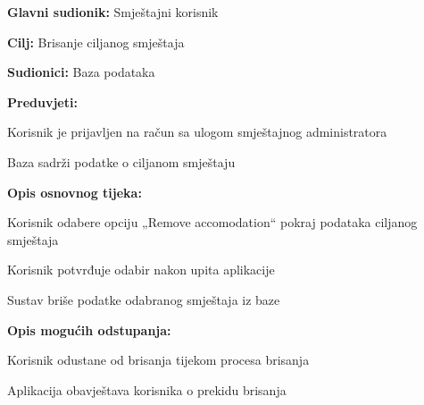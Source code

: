 					\noindent {}
					\begin{packed_item}
						\item \textbf{Glavni sudionik:} Smještajni korisnik
						\item  \textbf{Cilj:} Brisanje ciljanog smještaja
						\item  \textbf{Sudionici:} Baza podataka
						\item  \textbf{Preduvjeti:}
						\item[] \begin{packed_enum}
							\item Korisnik je prijavljen na račun sa ulogom smještajnog administratora
							\item Baza sadrži podatke o ciljanom smještaju
						\end{packed_enum}
						
						\item  \textbf{Opis osnovnog tijeka:}
						\item[] \begin{packed_enum}
							\item Korisnik odabere opciju „Remove accomodation“ pokraj podataka ciljanog smještaja
							\item Korisnik potvrđuje odabir nakon upita aplikacije
							\item Sustav briše podatke odabranog smještaja iz baze
						\end{packed_enum}
						
						\item  \textbf{Opis mogućih odstupanja:}
						\item[] \begin{packed_item}
							\item[2.a] Korisnik odustane od brisanja tijekom procesa brisanja
							\item[] \begin{packed_enum}
								\item Aplikacija obavještava korisnika o prekidu brisanja
							\end{packed_enum}
						\end{packed_item}
					\end{packed_item}
					
